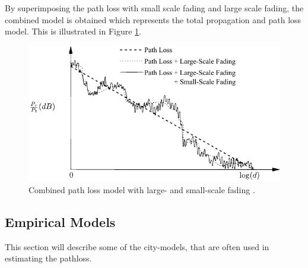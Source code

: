 By superimposing the path loss with small scale fading and large scale fading, the combined model is obtained which represents the total propagation and path loss model. This is illustrated in Figure \ref{fig:mul_combined}. 

\begin{figure}[htbp]
    \centering
    \includegraphics{img/analysis/goldsmith_combined}
    \caption{Combined path loss model with large- and small-scale fading \cite{goldsmith2005wireless}.}
    \label{fig:mul_combined}
\end{figure}

\subsection{Empirical Models}
This section will describe some of the city-models, that are often used in estimating the pathloss. 

